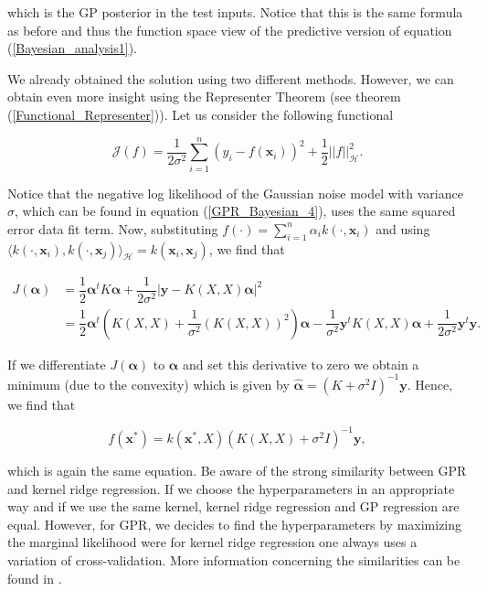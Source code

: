 \documentclass[12pt,a4paper,oneside]{book}
\begin{document}
which is the GP posterior in the test inputs. Notice that this is the same formula as before and thus the function space view of the predictive version of equation (\ref{Bayesian_analysis1}).


We already obtained the solution using two different methods. However, we can obtain even more insight using the Representer Theorem (see theorem (\ref{Functional_Representer})). Let us consider the following functional 

\begin{equation}
\mathcal{J}(f) =  \dfrac{1}{2\sigma^2}  \sum_{i=1}^n (y_i - f(\bm{x}_i))^2 + \dfrac{1}{2} ||f||^2_{\mathcal{H}} .
\end{equation}

Notice that the negative log likelihood of the Gaussian noise model with variance $\sigma$, which can be found in equation (\ref{GPR_Bayesian_4}), uses the same squared error data fit term. Now, substituting $f(\cdot)= \sum\nolimits_{i=1}^{n} \alpha_i k(\cdot, \bm{x}_i)$ and using $\langle k( \cdot, \bm{x}_i), k(\cdot, \bm{x}_j) \rangle_{\mathcal{H}} = k(\bm{x}_i,\bm{x}_j)$, we find that 

\begin{align}
J(\bm{\alpha}) &= \dfrac{1}{2} \bm{\alpha}^t K \bm{\alpha} + \dfrac{1}{2 \sigma^2} |\bm{y} - K(X,X) \bm{\alpha} | ^2  \nonumber \\
&= \dfrac{1}{2} \bm{\alpha}^t \left( K(X,X) + \dfrac{1}{ \sigma^2} (K(X,X))^2 \right) \bm{\alpha} - \dfrac{1}{ \sigma^2} \bm{y}^t K(X,X) \bm{\alpha} +  \dfrac{1}{2 \sigma^2} \bm{y}^t \bm{y}.
\end{align}

If we differentiate $ J(\bm{\alpha})$ to $\bm{\alpha}$ and set this derivative to zero we obtain a minimum (due to the convexity) which is given by $\hat{\bm{\alpha}} = (K + \sigma^2 I)^{-1} \bm{y}$. Hence, we find that

\begin{equation}\label{Function_Space_final_equation1}
\boxed{f(\bm{x}^{\ast}) = k(\bm{x}^{\ast},X) (K(X,X) + \sigma^2 I)^{-1} \bm{y}},
\end{equation}


which is again the same equation. Be aware of the strong similarity between GPR and kernel ridge regression. If we choose the hyperparameters in an appropriate way and if we use the same kernel, kernel ridge regression and GP regression are equal. However, for GPR, we decides to find the hyperparameters by maximizing the marginal likelihood were for kernel ridge regression one always uses a variation of cross-validation. More information concerning the similarities can be found in \cite{welling2013kernel}.
\end{document}
